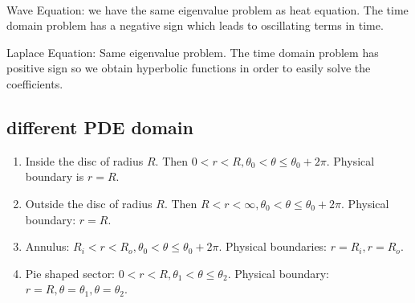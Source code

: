 \documentclass[class=article,crop=false]{standalone}
\begin{document}
\begin{remark}
~\\
Wave Equation: we have the same eigenvalue problem as heat equation. The time domain problem has a negative sign which leads to oscillating terms in time.

Laplace Equation: Same eigenvalue problem. The time domain problem has positive sign so we obtain hyperbolic functions in order to easily solve the coefficients.
\end{remark}

\subsection{different PDE domain}
\begin{enumerate}[label=\arabic*)]
	\item Inside the disc of radius $ R$. Then $ 0<r<R, \theta_0<\theta\leq \theta_0 + 2\pi$. Physical boundary is $ r=R$.
	\item Outside the disc of radius  $ R$. Then  $ R<r<\infty, \theta_0< \theta\leq \theta_0 + 2\pi$. Physical boundary: $ r=R$.
	\item Annulus: $ R_i<r<R_o, \theta_0<\theta\leq \theta_0 + 2\pi$. Physical boundaries: $ r=R_i, r=R_o$.
	\item Pie shaped sector: $ 0<r<R, \theta_1 < \theta \leq \theta_2$. Physical boundary: $ r=R, \theta = \theta_1, \theta=\theta_2$.
\end{enumerate}
\end{document}
